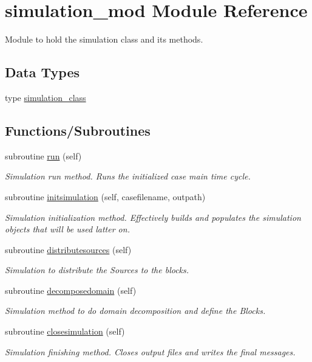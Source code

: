 \hypertarget{namespacesimulation__mod}{}\section{simulation\+\_\+mod Module Reference}
\label{namespacesimulation__mod}


Module to hold the simulation class and its methods.  


\subsection*{Data Types}
\begin{DoxyCompactItemize}
\item 
type \mbox{\hyperlink{structsimulation__mod_1_1simulation__class}{simulation\+\_\+class}}
\end{DoxyCompactItemize}
\subsection*{Functions/\+Subroutines}
\begin{DoxyCompactItemize}
\item 
subroutine \mbox{\hyperlink{namespacesimulation__mod_a73bd78c4ac76c51f1e10f5847c25c4df}{run}} (self)
\begin{DoxyCompactList}\small\item\em Simulation run method. Runs the initialized case main time cycle. \end{DoxyCompactList}\item 
subroutine \mbox{\hyperlink{namespacesimulation__mod_aedbba2bb458cbcd7eb93938a5f7b5940}{initsimulation}} (self, casefilename, outpath)
\begin{DoxyCompactList}\small\item\em Simulation initialization method. Effectively builds and populates the simulation objects that will be used latter on. \end{DoxyCompactList}\item 
subroutine \mbox{\hyperlink{namespacesimulation__mod_a726a2e98adc73c762cafd7baa88f58fd}{distributesources}} (self)
\begin{DoxyCompactList}\small\item\em Simulation to distribute the Sources to the blocks. \end{DoxyCompactList}\item 
subroutine \mbox{\hyperlink{namespacesimulation__mod_a2b8198a9fb3f7671c6b45192a0b9740c}{decomposedomain}} (self)
\begin{DoxyCompactList}\small\item\em Simulation method to do domain decomposition and define the Blocks. \end{DoxyCompactList}\item 
subroutine \mbox{\hyperlink{namespacesimulation__mod_a4285722eaa589fa671233554b54c74f8}{closesimulation}} (self)
\begin{DoxyCompactList}\small\item\em Simulation finishing method. Closes output files and writes the final messages. \end{DoxyCompactList}\end{DoxyCompactItemize}


